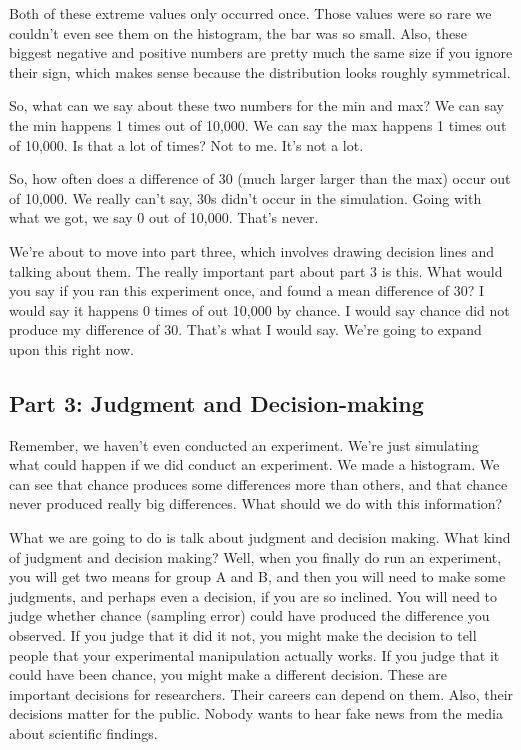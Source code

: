 \documentclass[]{book}
\begin{document}
Both of these extreme values only occurred once. Those values were so rare we couldn't even see them on the histogram, the bar was so small. Also, these biggest negative and positive numbers are pretty much the same size if you ignore their sign, which makes sense because the distribution looks roughly symmetrical.

So, what can we say about these two numbers for the min and max? We can say the min happens 1 times out of 10,000. We can say the max happens 1 times out of 10,000. Is that a lot of times? Not to me. It's not a lot.

So, how often does a difference of 30 (much larger larger than the max) occur out of 10,000. We really can't say, 30s didn't occur in the simulation. Going with what we got, we say 0 out of 10,000. That's never.

We're about to move into part three, which involves drawing decision lines and talking about them. The really important part about part 3 is this. What would you say if you ran this experiment once, and found a mean difference of 30? I would say it happens 0 times of out 10,000 by chance. I would say chance did not produce my difference of 30. That's what I would say. We're going to expand upon this right now.

\hypertarget{part-3-judgment-and-decision-making}{%
\subsection{Part 3: Judgment and Decision-making}\label{part-3-judgment-and-decision-making}}

Remember, we haven't even conducted an experiment. We're just simulating what could happen if we did conduct an experiment. We made a histogram. We can see that chance produces some differences more than others, and that chance never produced really big differences. What should we do with this information?

What we are going to do is talk about judgment and decision making. What kind of judgment and decision making? Well, when you finally do run an experiment, you will get two means for group A and B, and then you will need to make some judgments, and perhaps even a decision, if you are so inclined. You will need to judge whether chance (sampling error) could have produced the difference you observed. If you judge that it did it not, you might make the decision to tell people that your experimental manipulation actually works. If you judge that it could have been chance, you might make a different decision. These are important decisions for researchers. Their careers can depend on them. Also, their decisions matter for the public. Nobody wants to hear fake news from the media about scientific findings.
\end{document}
